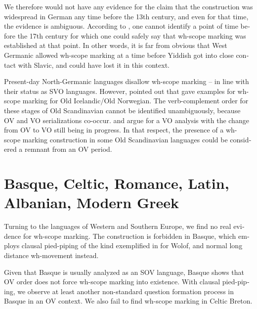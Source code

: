 \documentclass[output=paper,colorlinks,citecolor=brown]{langscibook}
\begin{document}
\begin{otherlanguage}{english}
\noindent  We therefore would not have any evidence for the claim that the construction was widespread in German any time before the 13th century, and even for that time, the evidence is ambiguous. According to \citet{Reis2000b}, one cannot identify a point of time before the 17th century for which one could safely say that wh-scope marking was established at that point. In other words, it is far from obvious that West Germanic allowed wh-scope marking at a time before Yiddish got into close contact with Slavic, and could have lost it in this context. 

Present-day North-Germanic languages disallow wh-scope marking -- in line with their status as SVO languages. However, \citet{Hakanson2004} pointed out that \citet{Falk-Torp1900} gave examples for wh-scope marking for Old Icelandic/Old Norwegian. The verb-complement order for these stages of Old Scandinavian cannot be identified unambiguously, because OV and VO serializations co-occur. \citet{Sigurdsson1988} and \citet{Haugen2000} argue for a VO analysis with the change from OV to VO still being in progress. In that respect, the presence of a wh-scope marking construction in some Old Scandinavian languages could be considered a remnant from an OV period.


\section{Basque, Celtic, Romance, Latin, Albanian, Modern Greek} \label{section:romance+}

Turning to the languages of Western and Southern Europe, we find no real evidence for wh-scope marking. The construction  is forbidden in Basque, which employs clausal pied-piping of the kind exemplified in  for Wolof, and normal long distance wh-movement instead.

    \label{ex:fanselow:8}
    \z

\noindent Given that Basque is usually analyzed as an SOV language, Basque shows that OV order does not force wh-scope marking into existence. With clausal pied-piping, we observe at least another non-standard question formation process in Basque in an OV context. We also fail to find wh-scope marking in Celtic Breton.


\end{otherlanguage}
\end{document}
